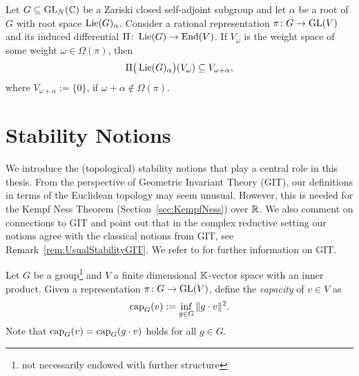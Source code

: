 \begin{prop} \label{prop:Roots}
	Let $G \subseteq \operatorname{GL}_N(\mathbb C)$ be a Zariski closed self-adjoint subgroup and let $\alpha$ be a root of $G$ with root space $\operatorname{Lie}(G)_\alpha$. Consider a rational representation $\pi \colon G \to \operatorname{GL}(V)$ and its induced differential $\Pi \colon \operatorname{Lie}(G) \to \operatorname{End}(V)$. If $V_\omega$ is the weight space of some weight $\omega \in \Omega(\pi)$, then
	\begin{align*}
		\Pi \big( \operatorname{Lie}(G)_\alpha \big) (V_\omega) \subseteq V_{\omega + \alpha},
	\end{align*}
	where $V_{\omega + \alpha} := \{0\}$, if $\omega + \alpha \notin \Omega(\pi)$.
\end{prop}







\section{Stability Notions} \label{sec:StabilityNotions}

We introduce the (topological) stability notions that play a central role in this thesis. From the perspective of Geometric Invariant Theory (GIT), our definitions in terms of the Euclidean topology may seem unusual. However, this is needed for the Kempf Ness Theorem (Section~\ref{sec:KempfNess}) over $\mathbb R$.
We also comment on connections to GIT and point out that in the complex reductive setting our notions agree with the classical notions from GIT, see Remark~\ref{rem:UsualStabilityGIT}. We refer to
\cite{DolgachevBook, hoskinsLectureModuli, KraftBook, mumford1977stability, MumfordGITbook, NewsteadBook, PopovVinberg}
for further information on GIT.

\medskip

Let $G$ be a group\footnote{not necessarily endowed with further structure} and $V$ a finite dimensional $\mathbb K$-vector space with an inner product. Given a representation $\pi \colon G \to \operatorname{GL}(V)$, define the \emph{capacity} of $v \in V$ as
\begin{equation}\label{eq:Capacity}
	\operatorname{cap}_G(v) := \inf_{g \in G} \| g \cdot v \|^2 . 
\end{equation}
Note that $\operatorname{cap}_G(v) = \operatorname{cap}_G(g \cdot v)$ holds for all $g \in G$.

